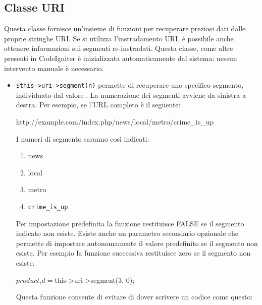 \subsection{Classe URI}
\label{class:uriclasse}

Questa classe fornisce un'insieme di funzioni per recuperare preziosi dati dalle proprie stringhe URI. Se si utilizza l'instradamento URI, è possibile anche ottenere informazioni sui segmenti re-instradati. Questa classe, come altre presenti in CodeIgniter è inizializzata automaticamente dal sistema: nessun intervento manuale è necessario.

\begin{itemize}
\item \verb|$this->uri->segment(n)| permette di recuperare uno specifico segmento, individuato dal valore . La numerazione dei segmenti avviene da sinistra a destra. Per esempio, se l'\ac{URL} completo è il seguente:

\begin{code}
http://example.com/index.php/news/local/metro/crime_is_up
\end{code}

I numeri di segmento saranno così indicati:

\begin{enumerate}
\item news
\item local
\item metro
\item \verb|crime_is_up|
\end{enumerate}

Per impostazione predefinita la funzione restituisce FALSE se il segmento indicato non esiste. Esiste anche un parametro secondario opzionale che permette di impostare autonomamente il valore predefinito se il segmento non esiste. Per esempio la funzione successiva restituisce zero se il segmento non esiste.

\begin{code}
$product_id = $this->uri->segment(3, 0);
\end{code}

Questa funzione consente di evitare di dover scrivere un codice come questo:



\end{itemize}
